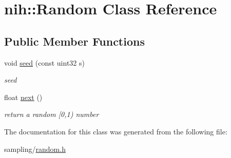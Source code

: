 \hypertarget{classnih_1_1_random}{
\section{nih\-:\-:\-Random \-Class \-Reference}
\label{classnih_1_1_random}
}
\subsection*{\-Public \-Member \-Functions}
\begin{DoxyCompactItemize}
\item 
\hypertarget{classnih_1_1_random_a037c1df5bc15ae1c6c21450130aacecc}{
void \hyperlink{classnih_1_1_random_a037c1df5bc15ae1c6c21450130aacecc}{seed} (const uint32 s)}
\label{classnih_1_1_random_a037c1df5bc15ae1c6c21450130aacecc}

\begin{DoxyCompactList}\small\item\em seed \end{DoxyCompactList}\item 
\hypertarget{classnih_1_1_random_a5ae3693b17aa9d42645fc669181843f5}{
float \hyperlink{classnih_1_1_random_a5ae3693b17aa9d42645fc669181843f5}{next} ()}
\label{classnih_1_1_random_a5ae3693b17aa9d42645fc669181843f5}

\begin{DoxyCompactList}\small\item\em return a random \mbox{[}0,1) number \end{DoxyCompactList}\end{DoxyCompactItemize}


\-The documentation for this class was generated from the following file\-:\begin{DoxyCompactItemize}
\item 
sampling/\hyperlink{random_8h}{random.\-h}\end{DoxyCompactItemize}
